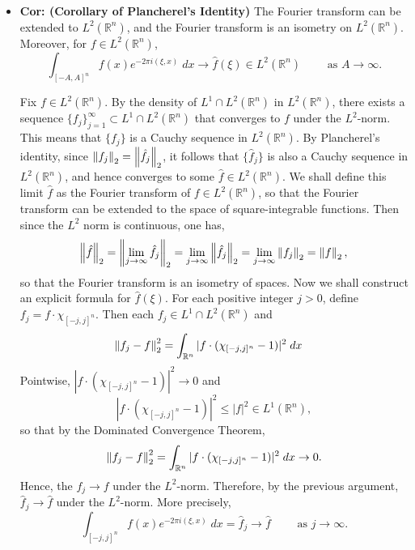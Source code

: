 \documentclass{article}
\begin{document}
\begin{itemize}
	\item \textbf{Cor: (Corollary of Plancherel's Identity)} The Fourier transform can be extended to $L^{2}(\mathbb{R}^{n})$, and the Fourier transform is an isometry on $L^{2}(\mathbb{R}^{n})$. Moreover, for $f \in L^{2}(\mathbb{R}^{n})$, 
		\begin{equation}
			\int_{[-A,A]^{n}}f(x)e^{-2\pi i (\xi, x)}\;dx \longrightarrow \hat{f}(\xi) \in L^{2}(\mathbb{R}^{n}) \qquad \text{ as $A \to \infty$}.
		\end{equation}
	
	{\color{orange}
		Fix $f \in L^{2}(\mathbb{R}^{n})$. By the density of $L^{1} \cap L^{2}(\mathbb{R}^{n})$ in $L^{2}(\mathbb{R}^{n})$, there exists a sequence $\{f_{j}\}_{j = 1}^{\infty} \subset L^{1} \cap L^{2}(\mathbb{R}^{n})$ that converges to $f$ under the $L^{2}$-norm. This means that $\{f_{j}\}$ is a Cauchy sequence in $L^{2}(\mathbb{R}^{n})$. By Plancherel's identity, since $\left\Vert f_{j} \right\Vert_{2} = \left\Vert \hat{f}_{j} \right\Vert_{2}$, it follows that $\{\hat{f}_{j}\}$ is also a Cauchy sequence in $L^{2}(\mathbb{R}^{n})$, and hence converges to some $\hat{f} \in L^{2}(\mathbb{R}^{n})$. We shall define this limit $\hat{f}$ as the Fourier transform of $f \in L^{2}(\mathbb{R}^{n})$, so that the Fourier transform can be extended to the space of square-integrable functions. Then since the $L^{2}$ norm is continuous, one has, 
			\begin{equation}
				\left\Vert \hat{f} \right\Vert_{2} = \left\Vert \lim_{j \to \infty}\hat{f}_{j} \right\Vert_{2} = \lim_{j \to \infty}\left\Vert \hat{f}_{j} \right\Vert_{2} = \lim_{j \to \infty}\left\Vert f_{j} \right\Vert_{2} = \left\Vert f \right\Vert_{2},
			\end{equation}
		so that the Fourier transform is an isometry of spaces. Now we shall construct an explicit formula for $\hat{f}(\xi)$. For each positive integer $j > 0$, define $f_{j} = f \cdot \chi_{[-j,j]^{n}}$. Then each $f_{j} \in L^{1} \cap L^{2}(\mathbb{R}^{n})$ and 
			\begin{align}
				\begin{split}
					\left\Vert f_{j} - f \right\Vert_{2}^{2} &= \int_{\mathbb{R}^{n}}|f \cdot (\chi_{[-j,j]^{n}} -1)|^{2}\;dx 
				\end{split}
			\end{align}
		Pointwise, $|f \cdot (\chi_{[-j,j]^{n}} - 1)|^{2} \to 0$ and 
			\begin{equation}
				|f \cdot (\chi_{[-j,j]^{n}} - 1)|^{2} \leq |f|^{2} \in L^{1}(\mathbb{R}^{n}), 
			\end{equation}
		so that by the Dominated Convergence Theorem, 
			\begin{equation}
				\left\Vert f_{j} - f \right\Vert_{2}^{2} = \int_{\mathbb{R}^{n}}|f \cdot (\chi_{[-j,j]^{n}} -1)|^{2}\;dx  \to 0. 
			\end{equation}
		Hence, the $f_{j} \to f$ under the $L^{2}$-norm. Therefore, by the previous argument, $\hat{f}_{j} \to \hat{f}$ under the $L^{2}$-norm. More precisely, 
			\begin{equation}
				\int_{[-j,j]^{n}}f(x)e^{-2\pi i(\xi, x)}\;dx = \hat{f}_{j} \longrightarrow \hat{f} \qquad \text{ as $j \to \infty$}.
			\end{equation}
	}
	

\end{itemize}
\end{document}
